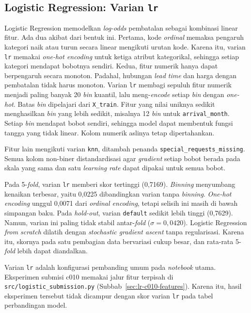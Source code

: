 \subsection{Logistic Regression: Varian \texttt{lr}}

Logistic Regression memodelkan \textit{log-odds} pembatalan sebagai kombinasi
linear fitur. Ada dua akibat dari bentuk ini. Pertama, kode \textit{ordinal}
memaksa pengaruh kategori naik atau turun secara linear mengikuti urutan kode.
Karena itu, varian \texttt{lr} memakai \textit{one-hot encoding} untuk ketiga
atribut kategorikal, sehingga setiap kategori mendapat bobotnya sendiri. Kedua,
fitur numerik hanya dapat berpengaruh secara monoton. Padahal, hubungan
\textit{lead time} dan harga dengan pembatalan tidak harus monoton. Varian
\texttt{lr} membagi sepuluh fitur numerik menjadi paling banyak 20 \textit{bin}
kuantil, lalu meng-\textit{encode} setiap \textit{bin} dengan \textit{one-hot}.
Batas \textit{bin} dipelajari dari \texttt{X\_train}. Fitur yang nilai uniknya
sedikit menghasilkan \textit{bin} yang lebih sedikit, misalnya 12 \textit{bin}
untuk \texttt{arrival\_month}. Setiap \textit{bin} mendapat bobot sendiri,
sehingga model dapat membentuk fungsi tangga yang tidak linear. Kolom numerik
aslinya tetap dipertahankan.

Fitur lain mengikuti varian \texttt{knn}, ditambah penanda
\texttt{special\_requests\_missing}. Semua kolom non-biner distandardisasi agar
\textit{gradient} setiap bobot berada pada skala yang sama dan satu
\textit{learning rate} dapat dipakai untuk semua bobot.

Pada 5-\textit{fold}, varian \texttt{lr} memberi skor tertinggi (0,7169).
\textit{Binning} menyumbang kenaikan terbesar, yaitu 0,0225 dibandingkan varian
tanpa \textit{binning}. \textit{One-hot encoding} unggul 0,0071 dari
\textit{ordinal encoding}, tetapi selisih ini masih di bawah simpangan baku.
Pada \textit{hold-out}, varian \texttt{default} sedikit lebih tinggi (0,7629).
Namun, varian ini paling tidak stabil antar-\textit{fold} ($\sigma=0{,}0420$).
Logistic Regression \textit{from scratch} dilatih dengan \textit{stochastic
gradient ascent} tanpa regularisasi. Karena itu, skornya pada satu pembagian data
bervariasi cukup besar, dan rata-rata 5-\textit{fold} lebih dapat diandalkan.

Varian \texttt{lr} adalah konfigurasi pembanding umum pada \textit{notebook}
utama. Eksperimen submisi c010 memakai jalur fitur terpisah di
\texttt{src/logistic\_submission.py} (Subbab~\ref{sec:lr-c010-features}). Karena
itu, hasil eksperimen tersebut tidak dicampur dengan skor varian \texttt{lr} pada
tabel perbandingan model.

